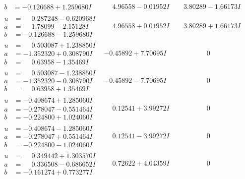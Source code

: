 \documentclass[1p]{elsarticle_modified}
\theoremstyle{definition}
\begin{document}
$$\begin{array}{c|c|c}
\begin{aligned}
b &= -0.126688 + 1.259680 I\end{aligned}
 & \phantom{-}4.96558 - 0.01952 I & \phantom{-}3.80289 - 1.66173 I \\ \hline\begin{aligned}
u &= \phantom{-}0.287248 - 0.620968 I \\
a &= \phantom{-}1.78099 - 2.15128 I \\
b &= -0.126688 - 1.259680 I\end{aligned}
 & \phantom{-}4.96558 + 0.01952 I & \phantom{-}3.80289 + 1.66173 I \\ \hline\begin{aligned}
u &= \phantom{-}0.503087 + 1.238850 I \\
a &= -1.352320 + 0.308790 I \\
b &= \phantom{-}0.63958 - 1.35469 I\end{aligned}
 & -0.45892 + 7.70695 I & \phantom{-0.000000 } 0 \\ \hline\begin{aligned}
u &= \phantom{-}0.503087 - 1.238850 I \\
a &= -1.352320 - 0.308790 I \\
b &= \phantom{-}0.63958 + 1.35469 I\end{aligned}
 & -0.45892 - 7.70695 I & \phantom{-0.000000 } 0 \\ \hline\begin{aligned}
u &= -0.408674 + 1.285060 I \\
a &= -0.278047 - 0.551464 I \\
b &= -0.224800 + 1.024060 I\end{aligned}
 & \phantom{-}0.12541 + 3.99272 I & \phantom{-0.000000 } 0 \\ \hline\begin{aligned}
u &= -0.408674 - 1.285060 I \\
a &= -0.278047 + 0.551464 I \\
b &= -0.224800 - 1.024060 I\end{aligned}
 & \phantom{-}0.12541 - 3.99272 I & \phantom{-0.000000 } 0 \\ \hline\begin{aligned}
u &= \phantom{-}0.349442 + 1.303570 I \\
a &= \phantom{-}0.336508 - 0.686652 I \\
b &= -0.161274 + 0.773277 I\end{aligned}
 & \phantom{-}0.72622 + 4.04359 I & \phantom{-0.000000 } 0 \\ \hline\begin{aligned}

\end{aligned}
\end{array}$$
\end{document}
